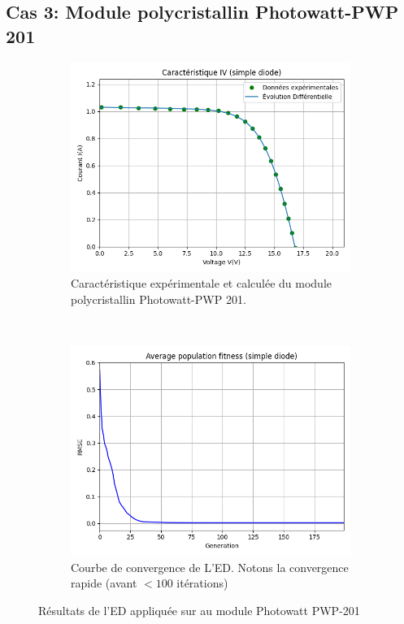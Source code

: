 \subsection{Cas 3: Module polycristallin Photowatt-PWP 201}

\begin{figure}
    \centering
    \begin{subfigure}[b]{0.45\textwidth}
        \includegraphics[width=\textwidth]{resources/pwp/iv.png}
        \caption{Caractéristique expérimentale et calculée du module polycristallin Photowatt-PWP 201.}
    \end{subfigure}
    ~
    \begin{subfigure}[b]{0.45\textwidth}
        \includegraphics[width=\textwidth]{resources/pwp/fitness.png}
        \caption{Courbe de convergence de L'ED. Notons la convergence rapide (avant $< 100$ itérations)}
    \end{subfigure}
    \caption{Résultats de l'ED appliquée sur au module Photowatt PWP-201}
    \label{fig:pwpsingle}
\end{figure}
